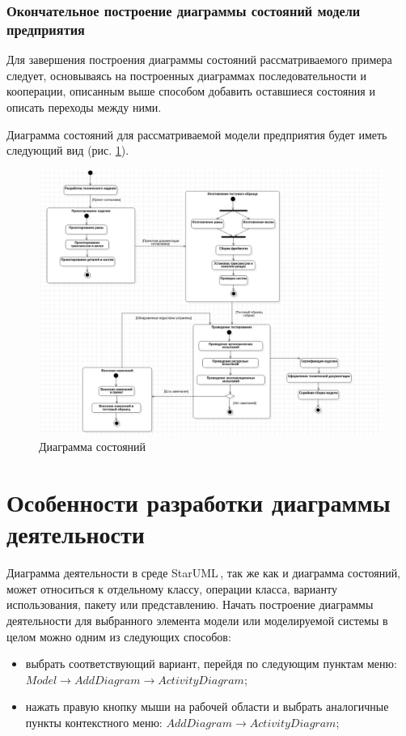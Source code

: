 \documentclass[a4paper,12pt]{report}
\newcommand{\staruml}{StarUML\,\tm}
\begin{document}
\subsubsection*{Окончательное построение диаграммы состояний модели предприятия}
Для завершения построения диаграммы состояний рассматриваемого примера следует, основываясь на построенных диаграммах последовательности и кооперации, описанным выше способом добавить оставшиеся состояния и описать переходы между ними.

Диаграмма состояний для рассматриваемой модели предприятия будет иметь следующий вид (рис. \ref{fig:statechart}).
\begin{figure}[h!]
	\centering
	\includegraphics[width=1\linewidth]{images/statechart}
	\caption{Диаграмма состояний}
	\label{fig:statechart}
\end{figure}

\section{Особенности разработки диаграммы деятельности}
Диаграмма деятельности в среде \staruml, так же как и диаграмма состояний, может относиться к отдельному классу, операции класса, варианту использования, пакету или представлению. Начать построение диаграммы деятельности для выбранного элемента модели или моделируемой системы в целом можно одним из следующих способов:
\begin{itemize}
	\item выбрать соответствующий вариант, перейдя по следующим пунктам меню: \\$Model \to Add Diagram \to Activity Diagram$;
	\item нажать правую кнопку мыши на рабочей области и выбрать аналогичные пункты контекстного меню: $Add Diagram \to Activity Diagram$;
\end{itemize}
\end{document}
